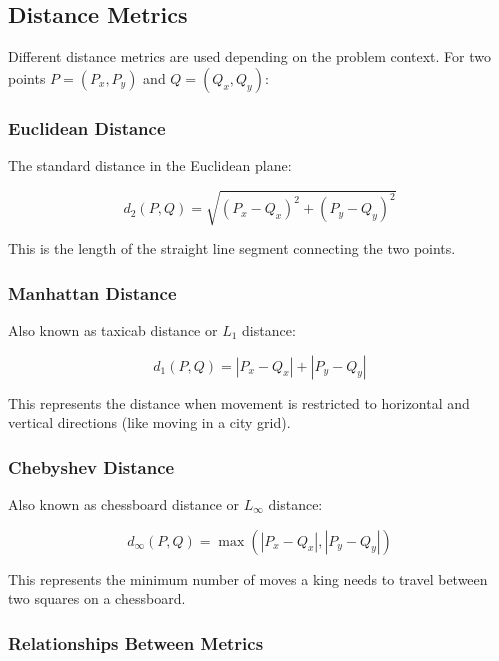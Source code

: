 \subsection{Distance Metrics}

Different distance metrics are used depending on the problem context. For two points $P = (P_x, P_y)$ and $Q = (Q_x, Q_y)$:

\subsubsection{Euclidean Distance}

The standard distance in the Euclidean plane:

\begin{equation}
    d_2(P, Q) = \sqrt{(P_x - Q_x)^2 + (P_y - Q_y)^2}
\end{equation}

This is the length of the straight line segment connecting the two points.

\subsubsection{Manhattan Distance}

Also known as taxicab distance or $L_1$ distance:

\begin{equation}
    d_1(P, Q) = |P_x - Q_x| + |P_y - Q_y|
\end{equation}

This represents the distance when movement is restricted to horizontal and vertical directions (like moving in a city grid).

\subsubsection{Chebyshev Distance}

Also known as chessboard distance or $L_\infty$ distance:

\begin{equation}
    d_\infty(P, Q) = \max(|P_x - Q_x|, |P_y - Q_y|)
\end{equation}

This represents the minimum number of moves a king needs to travel between two squares on a chessboard.

\subsubsection{Relationships Between Metrics}

